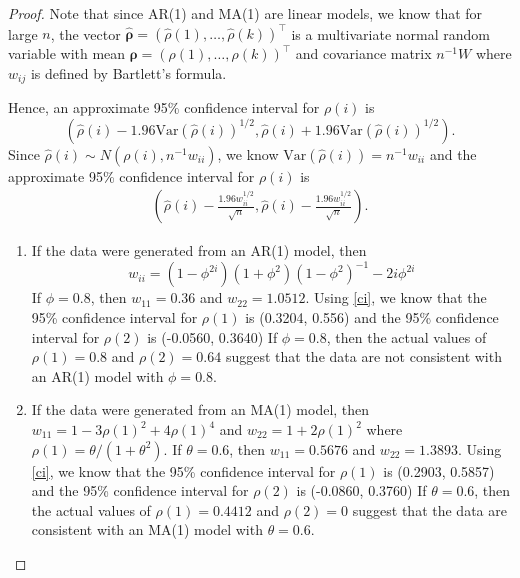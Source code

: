 \documentclass[12pt]{article}
\theoremstyle{definition}
\newcommand{\V}{\text{Var}}
\newcommand{\vect}[1]{\boldsymbol{#1}}
\begin{document}
\begin{proof}
  Note that since AR(1) and MA(1) are linear models, we know that for large $n$,
  the vector $\vect{\hat{\rho}} = (\hat{\rho}(1), \dots, \hat{\rho}(k))^\intercal$
  is a multivariate normal random variable with mean $\vect{\rho} = (\rho(1), \dots, \rho(k))^\intercal$
  and covariance matrix $n^{-1}W$ where $w_{ij}$ is defined by Bartlett's formula.

  Hence, an approximate 95\% confidence interval for
  $\rho(i)$ is
  \[
    \left(\hat{\rho}(i) - 1.96\V(\hat{\rho}(i))^{1/2}, \hat{\rho}(i) + 1.96\V(\hat{\rho}(i))^{1/2}\right).
  \]
  Since $\hat{\rho}(i) \sim N(\rho(i), n^{-1}w_{ii})$, we know $\V(\hat{\rho}(i)) = n^{-1}w_{ii}$ and the
  approximate 95\% confidence interval for $\rho(i)$ is
  \begin{align}\label{ci}
    \left(\hat{\rho}(i) - \frac{1.96w_{ii}^{1/2}}{\sqrt{n}}, \hat{\rho}(i) - \frac{1.96w_{ii}^{1/2}}{\sqrt{n}}\right).
  \end{align}
  \begin{enumerate}
    \item If the data were generated from an AR(1) model,
      then $$w_{ii} = (1 - \phi^{2i})(1 + \phi^2)(1 - \phi^2)^{-1} - 2i\phi^{2i}$$
      If $\phi = 0.8$, then $w_{11} = 0.36$ and $w_{22} = 1.0512$. Using \eqref{ci}, we know
      that the 95\% confidence interval for $\rho(1)$ is (0.3204, 0.556) and
      the 95\% confidence interval for $\rho(2)$ is (-0.0560, 0.3640)
      If $\phi = 0.8$, then the actual values of $\rho(1) = 0.8$ and $\rho(2) = 0.64$
      suggest that the data are not consistent with an AR(1) model with
      $\phi = 0.8.$
    \item If the data were generated from an MA(1) model,
      then $w_{11} = 1 - 3 \rho(1)^2 + 4 \rho(1)^4$ and $w_{22} = 1 + 2 \rho(1)^2$ where $\rho(1) = \theta / (1 + \theta^2)$.
      If $\theta = 0.6$, then $w_{11} = 0.5676$ and $w_{22} = 1.3893$. Using \eqref{ci}, we know
      that the 95\% confidence interval for $\rho(1)$ is (0.2903, 0.5857) and
      the 95\% confidence interval for $\rho(2)$ is (-0.0860, 0.3760)
      If $\theta = 0.6$, then the actual values of $\rho(1) = 0.4412$ and $\rho(2) = 0$
      suggest that the data are consistent with an MA(1) model with
      $\theta = 0.6.$
  \end{enumerate}
\end{proof}
\end{document}
